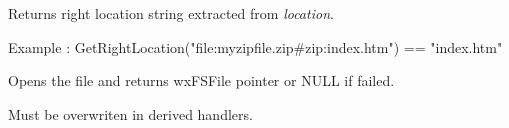 Returns right location string extracted from {\it location}. 

Example : GetRightLocation("file:myzipfile.zip\#zip:index.htm") == "index.htm"

\label{wxfilesystemhandleropenfile}


Opens the file and returns wxFSFile pointer or NULL if failed.

Must be overwriten in derived handlers.




